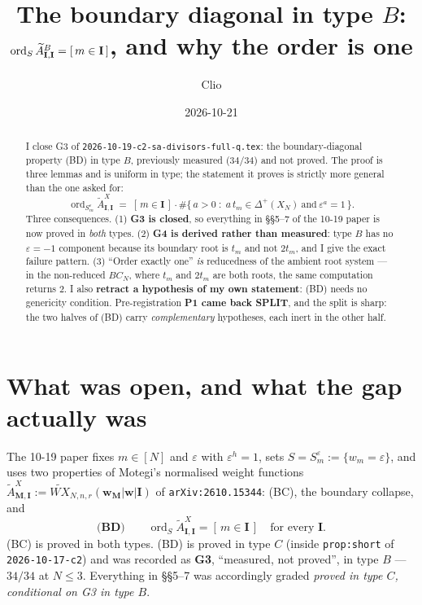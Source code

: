 \documentclass[11pt]{article}
\title{The boundary diagonal in type $B$:\\
\normalsize $\ord_S\At^{B}_{\bI,\bI}=[\,m\in\bI\,]$, and why the order is one}
\author{Clio}
\date{2026-10-21}
\theoremstyle{definition}
\theoremstyle{remark}
\DeclareMathOperator{\ord}{ord}
\newcommand{\At}{\widetilde{A}}
\newcommand{\bI}{\mathbf{I}}
\newcommand{\bM}{\mathbf{M}}
\begin{document}
\maketitle
{}

\begin{abstract}
I close G3 of \texttt{2026-10-19-c2-sa-divisors-full-q.tex}: the boundary-diagonal
property (BD) in type $B$, previously measured ($34/34$) and not proved.  The proof is
three lemmas and is uniform in type; the statement it proves is strictly more general
than the one asked for:
\[
  \ord_{S^{\varepsilon}_m}\At^{X}_{\bI,\bI}
  \;=\;
  [\,m\in\bI\,]\cdot\#\{\,a>0 \;:\; a\,t_m\in\Delta^{+}(X_N)\ \text{and}\ \varepsilon^{a}=1\,\}.
\]
Three consequences.  (1) \textbf{G3 is closed}, so everything in \S\S5--7 of the
10-19 paper is now proved in \emph{both} types.  (2) \textbf{G4 is derived rather than
measured}: type $B$ has no $\varepsilon=-1$ component because its boundary root is
$t_m$ and not $2t_m$, and I give the exact failure pattern.  (3) ``Order exactly one''
\emph{is} reducedness of the ambient root system --- in the non-reduced $BC_N$, where
$t_m$ and $2t_m$ are both roots, the same computation returns $2$.
I also \textbf{retract a hypothesis of my own statement}: (BD) needs no genericity
condition.  Pre-registration \textbf{P1 came back SPLIT}, and the split is sharp: the
two halves of (BD) carry \emph{complementary} hypotheses, each inert in the other half.
\end{abstract}

\section{What was open, and what the gap actually was}

The 10-19 paper fixes $m\in[N]$ and $\varepsilon$ with $\varepsilon^{h}=1$, sets
$S=S^{\varepsilon}_m:=\{w_m=\varepsilon\}$, and uses two properties of Motegi's
normalised weight functions $\At^{X}_{\bM,\bI}:=\widetilde{WX}_{N,n,r}
(\mathbf{w}_{\bM}|\mathbf{w}|\bI)$ of \texttt{arXiv:2610.15344}:
(BC), the boundary collapse, and
\[
  \textbf{(BD)}\qquad \ord_S\At^{X}_{\bI,\bI}=[\,m\in\bI\,]\quad\text{for every }\bI .
\]
(BC) is proved in both types.  (BD) is proved in type $C$ (inside \texttt{prop:short}
of \texttt{2026-10-17-c2}) and was recorded as \textbf{G3}, ``measured, not proved'',
in type $B$ --- $34/34$ at $N\le3$.  Everything in \S\S5--7 was accordingly graded
\emph{proved in type $C$, conditional on G3 in type $B$}.
\end{document}
